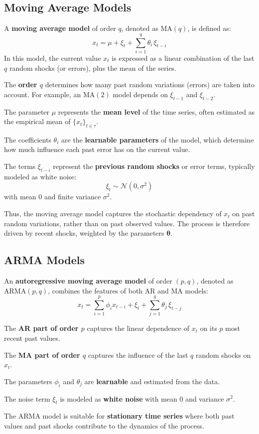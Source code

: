\subsection{Moving Average Models}
A \textbf{moving average model} of order $q$, denoted as $\text{MA}(q)$, is defined as:
\[
x_t = \mu + \xi_t + \sum_{i=1}^{q} \theta_i \, \xi_{t-i}
\]
In this model, the current value $x_t$ is expressed as a linear combination of the last $q$ random shocks (or errors), plus the mean of the series.
\begin{compactitemize}
    \item The \textbf{order $q$} determines how many past random variations (errors) are taken into account. For example, an $\text{MA}(2)$ model depends on $\xi_{t-1}$ and $\xi_{t-2}$.
    \item The parameter $\mu$ represents the \textbf{mean level} of the time series, often estimated as the empirical mean of $\{x_t\}_{t \in \tau}$.
    \item The coefficients $\theta_i$ are the \textbf{learnable parameters} of the model, which determine how much influence each past error has on the current value.
    \item The terms $\xi_{t-i}$ represent the \textbf{previous random shocks} or error terms, typically modeled as white noise:
    \[
    \xi_t \sim \mathcal{N}(0, \sigma^2)
    \]
    with mean $0$ and finite variance $\sigma^2$.
\end{compactitemize}
Thus, the moving average model captures the stochastic dependency of $x_t$ on past random variations, rather than on past observed values. The process is therefore driven by recent shocks, weighted by the parameters $\boldsymbol{\theta}$.

\subsection{ARMA Models}
An \textbf{autoregressive moving average model} of order $(p,q)$, denoted as $\text{ARMA}(p,q)$, combines the features of both AR and MA models:
\[
x_t = \sum_{i=1}^{p} \phi_i x_{t-i} + \xi_t + \sum_{j=1}^{q} \theta_j \, \xi_{t-j}
\]
\begin{compactitemize}
    \item The \textbf{AR part of order $p$} captures the linear dependence of $x_t$ on its $p$ most recent past values.
    \item The \textbf{MA part of order $q$} captures the influence of the last $q$ random shocks on $x_t$.
    \item The parameters $\phi_i$ and $\theta_j$ are \textbf{learnable} and estimated from the data.
    \item The noise term $\xi_t$ is modeled as \textbf{white noise} with mean $0$ and variance $\sigma^2$.
\end{compactitemize}
The ARMA model is suitable for \textbf{stationary time series} where both past values and past shocks contribute to the dynamics of the process.

